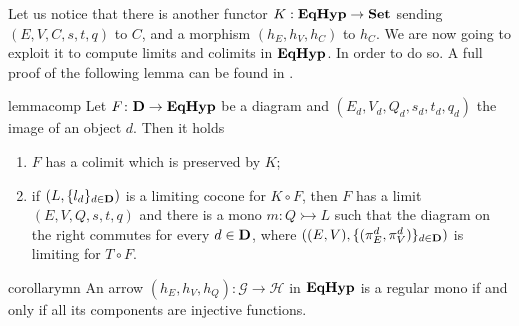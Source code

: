 \documentclass[a4paper,UKenglish,cleveref,pdftex,thm-restate,numberwithinsect]{lipics-v2021}
\newcommand{\Set}{\mathbf{Set}}
\def\D{\textbf {\textup{D}}}
\newcommand{\catname}[1]{\textbf{\textup{#1}}}
\newcommand{\EqHyp}{\catname{EqHyp}} %
\newcommand{\mto}{\rightarrowtail}
\begin{document}
Let us notice that there is another functor $K: \EqHyp \to \Set$ sending $(E, V, C, s, t, q)$ to $C$, and a morphism $(h_E, h_V, h_C)$ to $h_C$. We are now going to exploit it to compute limits and colimits in $\EqHyp$. In order to do so. A full proof of the following lemma can be found in .

\noindent
\parbox{11.4cm}{
\begin{restatable}{lemma}{comp}\label{prop:eqhyp_complete}
Let $F\colon \D \to \EqHyp$ be a diagram and $(E_d, V_d, Q_d, s_d, t_d, q_d)$ the image of an object $d$. Then it holds
\begin{enumerate}
		\item $F$ has a colimit which is preserved by $K$;
	\item if $(L, \{l_d\}_{d\in \D})$ is a limiting cocone for $K \circ F$, then $F$ has a limit $(E, V, Q, s, t, q)$ and there is a mono $m\colon Q\mto L$ such that the diagram on the right commutes for every $d\in \D$, where $((E, V), \{(\pi^d_E, \pi^d_V)\}_{d\in \D})$ is limiting for $T\circ F$.
\end{enumerate}
\end{restatable}}\hfill 
\parbox{3cm}{}   

\begin{restatable}{corollary}{mn}\label{cor:mono2}
	An arrow $(h_E, h_V, h_Q): \mathcal{G\to H}$ in $\EqHyp$ is a regular mono if and only if all its components are injective functions.
\end{restatable}
\end{document}
